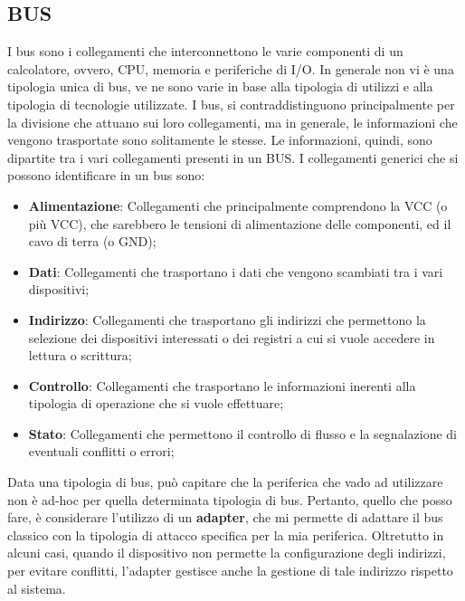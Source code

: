 \subsection{BUS}
I bus sono i collegamenti che interconnettono le varie componenti di un calcolatore, ovvero, CPU, memoria e periferiche di I/O.
In generale non vi è una tipologia unica di bus, ve ne sono varie in base alla tipologia di utilizzi e alla tipologia di tecnologie utilizzate.
I bus, si contraddistinguono principalmente per la divisione che attuano sui loro collegamenti, ma in generale, le informazioni che vengono trasportate sono solitamente le stesse.
Le informazioni, quindi, sono dipartite tra i vari collegamenti presenti in un BUS. I collegamenti generici che si possono identificare in un bus sono:
\begin{itemize}
    \item \textbf{Alimentazione}: Collegamenti che principalmente comprendono la VCC (o più VCC), che sarebbero le tensioni di alimentazione delle componenti, ed il cavo di terra (o GND);
    \item \textbf{Dati}: Collegamenti che trasportano i dati che vengono scambiati tra i vari dispositivi;
    \item \textbf{Indirizzo}: Collegamenti che trasportano gli indirizzi che permettono la selezione dei dispositivi interessati o dei registri a cui si vuole accedere in lettura o scrittura;
    \item \textbf{Controllo}: Collegamenti che trasportano le informazioni inerenti alla tipologia di operazione che si vuole effettuare;
    \item \textbf{Stato}: Collegamenti che permettono il controllo di flusso e la segnalazione di eventuali conflitti o errori;
\end{itemize}

Data una tipologia di bus, può capitare che la periferica che vado ad utilizzare non è ad-hoc per quella determinata tipologia di bus. Pertanto, quello che posso fare, è considerare l'utilizzo di un \textbf{adapter}, che mi permette di adattare il bus classico con la tipologia di attacco specifica per la mia periferica. Oltretutto in alcuni casi, quando il dispositivo non permette la configurazione degli indirizzi, per evitare conflitti, l'adapter gestisce anche la gestione di tale indirizzo rispetto al sistema.

